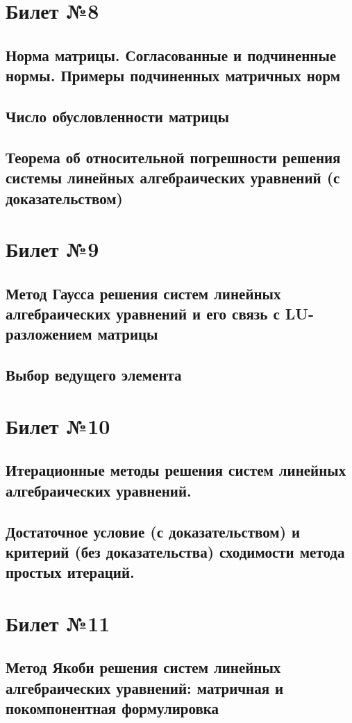 \documentclass[a4paper]{article}
\begin{document}
\section{Билет №8}
\subsection{Норма матрицы. Согласованные и подчиненные нормы. Примеры подчиненных матричных норм}
\subsection{Число обусловленности матрицы}
\subsection{Теорема об относительной погрешности решения системы линейных алгебраических уравнений (с доказательством)}

\section{Билет №9}
\subsection{Метод Гаусса решения систем линейных алгебраических уравнений и его связь с LU-разложением матрицы}
\subsection{Выбор ведущего элемента}

\section{Билет №10}
\subsection{Итерационные методы решения систем линейных алгебраических уравнений.}
\subsection{Достаточное условие (с доказательством) и критерий (без доказательства) сходимости метода простых итераций.}

\section{Билет №11}
\subsection{Метод Якоби решения систем линейных алгебраических уравнений: матричная и покомпонентная формулировка}
\end{document}
